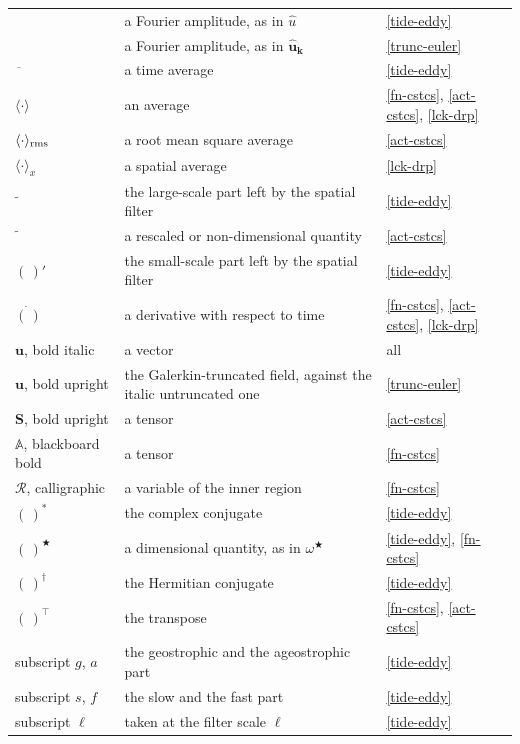 \begin{longtable}{@{}p{}p{}p{}@{}}
\addlinespace
$\widehat{\phantom{u}}\;$ & a Fourier amplitude, as in $\widehat{u}$ & \ref{tide-eddy} \\
$\hat{\phantom{u}}\;$ & a Fourier amplitude, as in $\widehat{\mathbf{u}}_{\mathbf{k}}$ & \ref{trunc-euler} \\
$\overline{\phantom{u}}\;$ & a time average & \ref{tide-eddy} \\
$\langle\cdot\rangle$ & an average & \ref{fn-cstcs}, \ref{act-cstcs}, \ref{lck-drp} \\
$\langle\cdot\rangle_{\rm rms}$ & a root mean square average & \ref{act-cstcs} \\
$\langle\cdot\rangle_x$ & a spatial average & \ref{lck-drp} \\
$\widetilde{\phantom{u}}\;$ & the large-scale part left by the spatial filter & \ref{tide-eddy} \\
$\tilde{\phantom{u}}\;$ & a rescaled or non-dimensional quantity & \ref{act-cstcs} \\
$(\,)'$ & the small-scale part left by the spatial filter & \ref{tide-eddy} \\
$\dot{(\,)}$ & a derivative with respect to time & \ref{fn-cstcs}, \ref{act-cstcs}, \ref{lck-drp} \\
$\boldsymbol{u}$, bold italic & a vector & all \\
$\mathbf{u}$, bold upright & the Galerkin-truncated field, against the italic untruncated one & \ref{trunc-euler} \\
$\mathbf{S}$, bold upright & a tensor & \ref{act-cstcs} \\
$\mathbb{A}$, blackboard bold & a tensor & \ref{fn-cstcs} \\
$\mathcal{R}$, calligraphic & a variable of the inner region & \ref{fn-cstcs} \\
$(\,)^*$ & the complex conjugate & \ref{tide-eddy} \\
$(\,)^\bigstar$ & a dimensional quantity, as in $\omega^\bigstar$ & \ref{tide-eddy}, \ref{fn-cstcs} \\
$(\,)^\dagger$ & the Hermitian conjugate & \ref{tide-eddy} \\
$(\,)^\top$ & the transpose & \ref{fn-cstcs}, \ref{act-cstcs} \\
subscript $g$, $a$ & the geostrophic and the ageostrophic part & \ref{tide-eddy} \\
subscript $s$, $f$ & the slow and the fast part & \ref{tide-eddy} \\
subscript $\ell$ & taken at the filter scale $\ell$ & \ref{tide-eddy} \\

\end{longtable}
